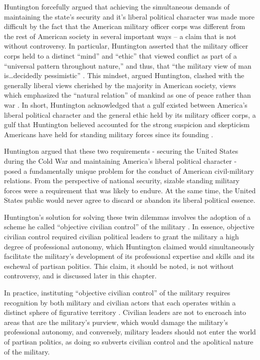 \documentclass[
  12pt,
  oneside]{memoir}
\begin{document}
Huntington forcefully argued that achieving the simultaneous demands of maintaining the state's security and it's liberal political character was made more difficult by the fact that the American military officer corps was different from the rest of American society in several important ways -- a claim that is not without controversy. In particular, Huntington asserted that the military officer corps held to a distinct ``mind'' and ``ethic'' that viewed conflict as part of a ``universal pattern throughout nature,'' and thus, that ``the military view of man is\ldots decidedly pessimistic'' \autocite[62-63]{huntington_soldier_1957}. This mindset, argued Huntington, clashed with the generally liberal views cherished by the majority in American society, views which emphasized the ``natural relation'' of mankind as one of peace rather than war \autocite[90]{huntington_soldier_1957}. In short, Huntington acknowledged that a gulf existed between America's liberal political character and the general ethic held by its military officer corps, a gulf that Huntington believed accounted for the strong suspicion and skepticism Americans have held for standing military forces since its founding \autocite[143-151]{huntington_soldier_1957}.

Huntington argued that these two requirements - securing the United States during the Cold War and maintaining America's liberal political character - posed a fundamentally unique problem for the conduct of American civil-military relations. From the perspective of national security, sizable standing military forces were a requirement that was likely to endure. At the same time, the United States public would never agree to discard or abandon its liberal political essence.

Huntington's solution for solving these twin dilemmas involves the adoption of a scheme he called ``objective civilian control'' of the military \autocite[83]{huntington_soldier_1957}. In essence, objective civilian control required civilian political leaders to grant the military a high degree of professional autonomy, which Huntington claimed would simultaneously facilitate the military's development of its professional expertise and skills and its eschewal of partisan politics. This claim, it should be noted, is not without controversy, and is discussed later in this chapter.

In practice, instituting ``objective civilian control'' of the military requires recognition by both military and civilian actors that each operates within a distinct sphere of figurative territory \autocite[83-85]{huntington_soldier_1957}. Civilian leaders are not to encroach into areas that are the military's purview, which would damage the military's professional autonomy, and conversely, military leaders should not enter the world of partisan politics, as doing so subverts civilian control and the apolitical nature of the military.
\end{document}
